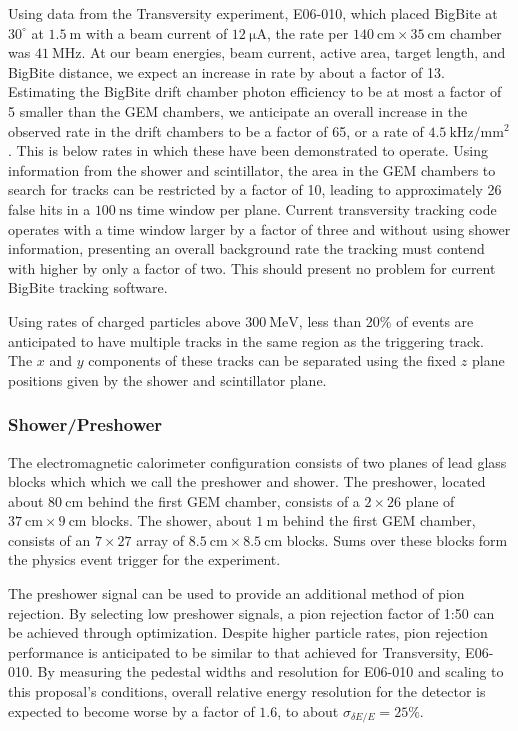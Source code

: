 Using data from the Transversity experiment, E06-010, which placed BigBite at $30^\circ$ at
$1.5~\mathrm{m}$ with a beam current of $12~\mathrm{\mu A}$, the rate per $140~\mathrm{cm}\times35~\mathrm{cm}$ chamber was $41~\mathrm{MHz}$.  
At our beam energies, beam current, active area, target length, and BigBite distance, we expect an increase in rate by about a factor of 13.  
Estimating the BigBite drift chamber photon efficiency to be at most a factor of 5 smaller than the GEM chambers, 
we anticipate an overall increase in the observed rate in the drift chambers to be a factor of 65, or a rate
of $4.5~\mathrm{kHz/mm^2}$. 
This is below rates in which these have been demonstrated to operate.
Using information from the shower and scintillator, the area in the GEM chambers to search for tracks can be restricted
 by a factor of 10, leading to approximately 26 false hits in a $100~\mathrm{ns}$ time window per plane.  
Current transversity tracking code operates with a time window larger by a factor of three
and without using shower information, presenting an overall background rate the tracking must
contend with higher by only a factor of two.  
This should present no problem for current BigBite tracking software.

Using rates of charged particles above $300~\mathrm{MeV}$, less than 20\% of events are anticipated 
to have multiple tracks in the same region as the triggering track.  
The $x$ and $y$ components of  these tracks can be separated using the fixed $z$ plane positions given by the shower and scintillator plane.
\fi

\subsubsection{Shower/Preshower}

The electromagnetic calorimeter configuration consists of two planes of lead glass blocks which  which we call the preshower and shower.  
The preshower, located about $80~\mathrm{cm}$ behind the first GEM chamber, consists of a $2\times26$ plane of $37~\mathrm{cm}\times 9~\mathrm{cm}$ blocks.  
The shower, about $1~\mathrm{m}$ behind the first GEM chamber, consists of an $7\times27$ array of $8.5~\mathrm{cm}\times8.5~\mathrm{cm}$ blocks.  Sums over these blocks form the physics event trigger for the experiment.

The preshower signal can be used to provide an additional method of pion rejection.  
By selecting low preshower signals, a pion rejection factor of 1:50 can be achieved through optimization.  
Despite higher particle rates, pion rejection performance is anticipated to be similar to that achieved for Transversity, E06-010.  
By measuring the pedestal widths and resolution for E06-010 and scaling to this proposal's conditions, overall relative energy resolution for the detector is expected to become worse by a factor of $1.6$, to about $\sigma_{\delta E/E} = 25\%$.

